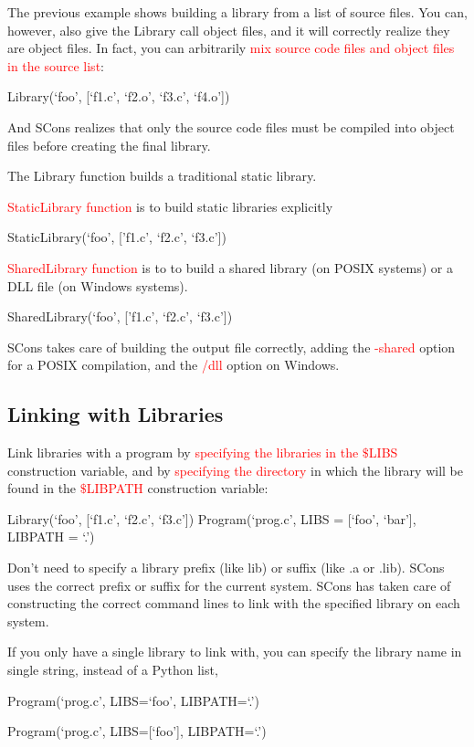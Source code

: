 \documentclass[12pt,a4paper]{article}
\begin{document}
The previous example shows building a library from a list of source files. You can, however, also give the Library call object files, and it will correctly realize they are object files. In fact, you can arbitrarily \textcolor{red}{mix source code files and object files in the source list}:

Library(`foo', [`f1.c', `f2.o', `f3.c', `f4.o'])

And SCons realizes that only the source code files must be compiled into object files before creating the final library.


The Library function builds a traditional static library. 

\textcolor{red}{StaticLibrary function} is to build static libraries explicitly

StaticLibrary(`foo', ['f1.c', `f2.c', `f3.c'])

\textcolor{red}{SharedLibrary function} is to to build a shared library (on POSIX systems) or a DLL file (on Windows systems).

SharedLibrary(`foo', ['f1.c', `f2.c', `f3.c'])

SCons takes care of building the output file correctly, adding the \textcolor{red}{-shared} option for a POSIX compilation, and the \textcolor{red}{/dll} option on Windows.

\subsection{Linking with Libraries}
Link libraries with a program by \textcolor{red}{specifying the libraries in the $\$$LIBS} construction variable, and by \textcolor{red}{specifying the directory} in which the library will be found in the \textcolor{red}{$\$$LIBPATH} construction variable:

Library(`foo', [`f1.c', `f2.c', `f3.c'])
Program(`prog.c', LIBS = [`foo', `bar'], LIBPATH = `.')

Don't need to specify a library prefix (like lib) or suffix (like .a or .lib). SCons uses the correct prefix or suffix for the current system. SCons has taken care of constructing the correct command lines to link with the specified library on each system.

If you only have a single library to link with, you can specify the library name in single string, instead of a Python list, 

Program(`prog.c', LIBS=`foo', LIBPATH=`.')

Program(`prog.c', LIBS=[`foo'], LIBPATH=`.')
\end{document}
